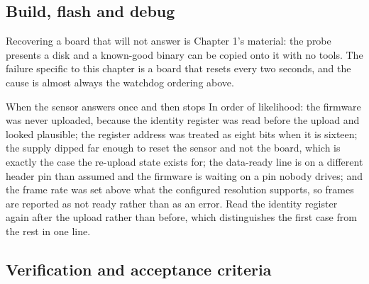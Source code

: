 \subsection*{Build, flash and debug}



Recovering a board that will not answer is Chapter 1's material: the probe
presents a disk and a known-good binary can be copied onto it with no tools. The
failure specific to this chapter is a board that resets every two seconds, and
the cause is almost always the watchdog ordering above.

\begin{note}{When the sensor answers once and then stops}
In order of likelihood: the firmware was never uploaded, because the identity
register was read before the upload and looked plausible; the register address
was treated as eight bits when it is sixteen; the supply dipped far enough to
reset the sensor and not the board, which is exactly the case the re-upload
state exists for; the data-ready line is on a different header pin than assumed
and the firmware is waiting on a pin nobody drives; and the frame rate was set
above what the configured resolution supports, so frames are reported as not
ready rather than as an error. Read the identity register again after the upload
rather than before, which distinguishes the first case from the rest in one
line.
\end{note}

\subsection*{Verification and acceptance criteria}

